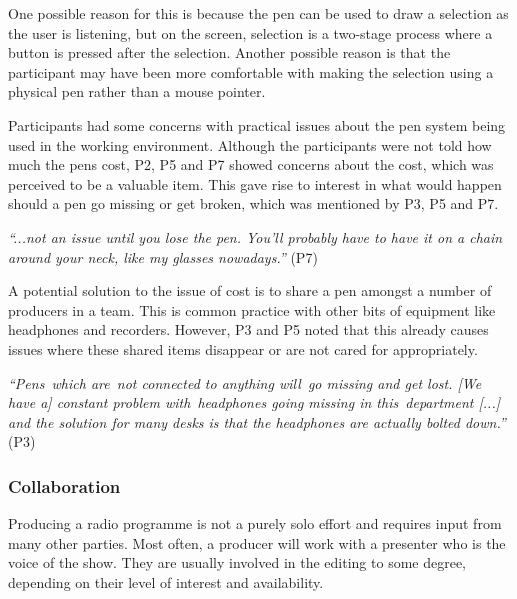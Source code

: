One possible reason for this is because the pen can be used to draw a selection as the user is listening, but on the
screen, selection is a two-stage process where a button is pressed after the selection. Another possible reason is that
the participant may have been more comfortable with making the selection using a physical pen rather than a mouse
pointer.



Participants had some concerns with practical issues about the pen system being used in the working environment.
Although the participants were not told how much the pens cost, P2, P5 and P7 showed concerns about the cost, which was
perceived to be a valuable item.  This gave rise to interest in what would happen should a pen go missing or get
broken, which was mentioned by P3, P5 and P7. 

\textit{``...not an issue until you lose the pen. You'll probably have to have it on a chain around your neck, like my
glasses nowadays.''} (P7)

A potential solution to the issue of cost is to share a pen amongst a number of producers in a team. This is
common practice with other bits of equipment like headphones and recorders. However, P3 and P5 noted that this already
causes issues where these shared items disappear or are not cared for appropriately.

\textit{``Pens which are not connected to anything will go missing and get lost.
  [We have a] constant problem with headphones going missing in this department [...]
and the solution for many desks is that the headphones are actually bolted down.''} (P3)

\subsubsection{Collaboration}


Producing a radio programme is not a purely solo effort and requires input from many other parties. Most
often, a producer will work with a presenter who is the voice of the show. They are usually involved in the
editing to some degree, depending on their level of interest and availability.

